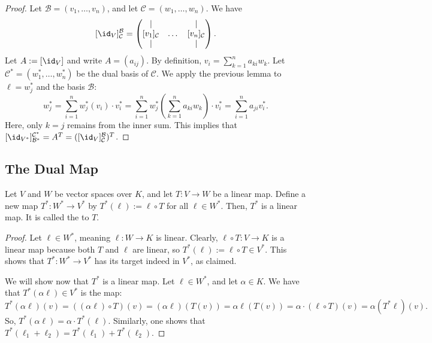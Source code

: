 \begin{proof}
  Let $\mathcal{B} = (v_1, \dots, v_n)$, and let $\mathcal{C} = (w_1, \dots, w_n)$. We have 
  \[[\id_V]_{\mathcal{C}}^{\mathcal{B}} = \begin{pmatrix} | & & | \\ [v_1]_{\mathcal{C}} & \dots & [v_n]_{\mathcal{C}} \\ | & & | \end{pmatrix}.\]
  Let $A := [\id_V]$ and write $A = (a_{ij})$. By definition, $v_i = \sum_{k=1}^n a_{ki} w_k$.
  Let $\mathcal{C}^* = (w_1^*, \dots, w_n^*)$ be the dual basis of $\mathcal{C}$. We apply the previous lemma to $\ell = w_j^*$ and the basis $\mathcal{B}$:
  \[ w_j^* = \sum_{i=1}^n w_j^*(v_i) \cdot v_i^* = \sum_{i=1}^n w_j^*\left(\sum_{k=1}^n a_{ki} w_k\right) \cdot v_i^* = \sum_{i=1}^n a_{ji} v_i^*. \]
  Here, only $k = j$ remains from the inner sum. This implies that $[\id_{V^*}]_{\mathcal{B}^*}^{\mathcal{C}^*} = A^T = ([\id_V]_{\mathcal{C}}^{\mathcal{B}})^T$.
\end{proof}

\subsection{The Dual Map}
\begin{lemma}
  Let $V$ and $W$ be vector spaces over $K$, and let $T \colon V \to W$ be a linear map. Define a new map $T^* \colon W^* \to V^*$ by $T^*(\ell) := \ell \circ T$ for all $\ell \in W^*$. Then, $T^*$ is a linear map. It is called the  to $T$.
\end{lemma}

\begin{proof}
  Let $\ell \in W^*$, meaning $\ell \colon W \to K$ is linear. Clearly, $\ell \circ T \colon V \to K$ is a linear map because both $T$ and $\ell$ are linear, so $T^*(\ell) := \ell \circ T \in V^*$. This shows that $T^* \colon W^* \to V^*$ has its target indeed in $V^*$, as claimed.

  We will show now that $T^*$ is a linear map. Let $\ell \in W^*$, and let $\alpha \in K$. We have that $T^*(\alpha \ell) \in V^*$ is the map:
  $$T^*(\alpha \ell)(v) = ((\alpha \ell) \circ T)(v) = (\alpha \ell)(T(v)) = \alpha \ell(T(v)) = \alpha \cdot (\ell \circ T)(v) = \alpha (T^* \ell)(v).$$
  So, $T^*(\alpha \ell) = \alpha \cdot T^*(\ell)$. Similarly, one shows that $T^*(\ell_1 + \ell_2) = T^*(\ell_1) + T^*(\ell_2)$.
\end{proof}

